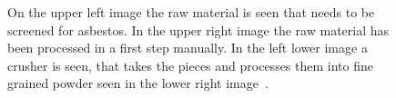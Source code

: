 \begin{figure}[h]
\centering
\caption{On the upper left image the raw material is seen that needs to be screened for asbestos. In the upper right image the raw material has been processed in a first step manually. In the left lower image a crusher is seen, that takes the pieces and processes them into fine grained powder seen in the lower right image~\cite{mohammed2015}. }
\label{fig:sampleprep}
\end{figure}


